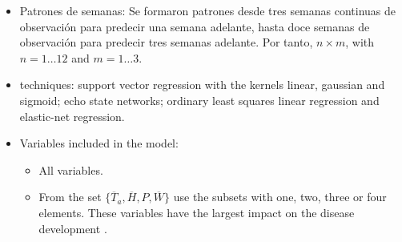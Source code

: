 \begin{itemize}
\item Patrones de semanas: Se formaron patrones desde tres semanas continuas
de observación para predecir una semana adelante, hasta doce semanas de
observación para predecir tres semanas adelante. Por tanto, $n\times{}m$, 
with $n=1\ldots{}12$ and $m=1\ldots{}3$.

\item techniques: support vector regression with the kernels linear,
  gaussian and sigmoid; echo state networks; ordinary least squares
  linear regression and elastic-net regression.

\item Variables included in the model:
\begin{itemize}
\item All variables.
\item From the set $\{ \overline{T}_{a} , \overline{H}, P ,
  \overline{W} \}$ use the subsets with one, two, three or four
  elements. These variables have the largest impact on the disease
  development \citep{MarinVargas1995}.
\end{itemize}

\end{itemize}
